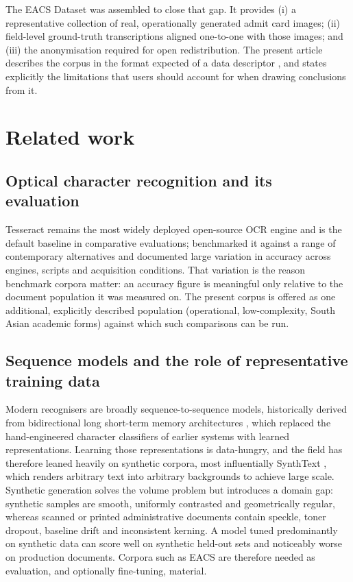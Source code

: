 \documentclass[a4paper,fleqn]{cas-dc}
\begin{document}
The EACS Dataset was assembled to close that gap. It provides (i) a
representative collection of real, operationally generated admit card images;
(ii) field-level ground-truth transcriptions aligned one-to-one with those
images; and (iii) the anonymisation required for open redistribution. The
present article describes the corpus in the format expected of a data
descriptor \citep{elsevier2024}, and states explicitly the limitations that
users should account for when drawing conclusions from it.

\section{Related work}

\subsection{Optical character recognition and its evaluation}

Tesseract \citep{smith2007} remains the most widely deployed open-source OCR
engine and is the default baseline in comparative evaluations;
\citet{reuel2019} benchmarked it against a range of contemporary alternatives
and documented large variation in accuracy across engines, scripts and
acquisition conditions. That variation is the reason benchmark corpora matter:
an accuracy figure is meaningful only relative to the document population it
was measured on. The present corpus is offered as one additional, explicitly
described population (operational, low-complexity, South Asian academic
forms) against which such comparisons can be run.

\subsection{Sequence models and the role of representative training data}

Modern recognisers are broadly sequence-to-sequence models, historically
derived from bidirectional long short-term memory architectures
\citep{graves2005}, which replaced the hand-engineered character classifiers
of earlier systems with learned representations. Learning those
representations is data-hungry, and the field has therefore leaned heavily on
synthetic corpora, most influentially SynthText \citep{ba2016}, which renders
arbitrary text into arbitrary backgrounds to achieve large scale. Synthetic
generation solves the volume problem but introduces a domain gap: synthetic
samples are smooth, uniformly contrasted and geometrically regular, whereas
scanned or printed administrative documents contain speckle, toner dropout,
baseline drift and inconsistent kerning. A model tuned predominantly on
synthetic data can score well on synthetic held-out sets and noticeably worse
on production documents. Corpora such as EACS are therefore needed as
evaluation, and optionally fine-tuning, material.
\end{document}
